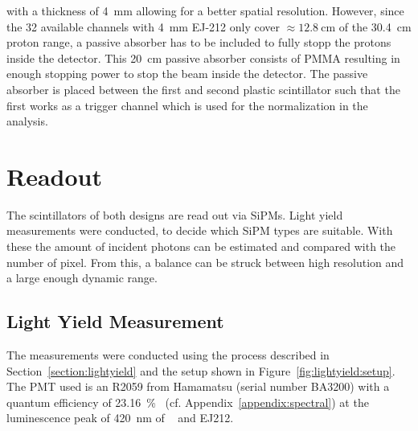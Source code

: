 with a thickness of \SI{4}{\mm} allowing for a better spatial resolution.
However, since the 32 available channels with \SI{4}{\mm} EJ-212 only cover $\approx \SI{12.8}{\centi\meter}$ of the \SI{30.4}{\centi\meter} proton range, a passive absorber has to be included to fully stopp the protons inside the detector.
This \SI{20}{\centi\meter} passive absorber consists of PMMA resulting in enough stopping power to stop the beam inside the detector.
The passive absorber is placed between the first and second plastic scintillator such that the first works as a trigger channel which is used for the normalization in the analysis.

\section{Readout}\label{section:readout}
The scintillators of both designs are read out via SiPMs.
Light yield measurements were conducted, to decide which SiPM types are suitable.
With these the amount of incident photons can be estimated and compared with the number of pixel.
From this, a balance can be struck between high resolution and a large enough dynamic range.
 
\subsection{Light Yield Measurement}
The measurements were conducted using the process described in Section~\ref{section:lightyield} and the setup shown in Figure~\ref{fig:lightyield:setup}.
The PMT used is an R2059 from Hamamatsu (serial number BA3200) with a quantum efficiency of \SI{23.16}{\percent}~\cite{datasheet:hamamatsu_R2059} (cf. Appendix~\ref{appendix:spectral}) at the luminescence peak of \SI{420}{\nano\meter} of ~\cite{cms:tdr} and EJ212.

